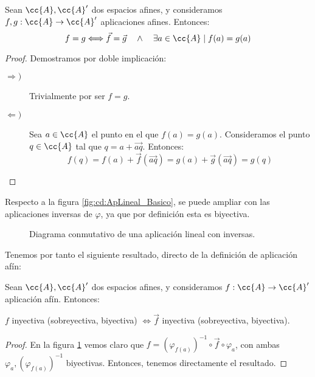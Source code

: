 \begin{teo}\label{teo:UnicidadLinealAsociada}
    Sean $\cc{A},\cc{A}'$ dos espacios afines, y consideramos $f,g:\cc{A}\to \cc{A}'$ aplicaciones afines. Entonces:
    \begin{equation*}
        f=g \Longleftrightarrow
         \vec{f}=\vec{g}
         \quad \land \quad
         \exists a\in \cc{A} \mid f(a)=g(a)
    \end{equation*}
\end{teo}
\begin{proof} Demostramos por doble implicación:
    \begin{description}
        \item[$\Longrightarrow)$] Trivialmente por ser $f=g$.
        \item[$\Longleftarrow)$] Sea $a\in \cc{A}$ el punto en el que $f(a)=g(a)$. Consideramos el punto $q\in \cc{A}$ tal que $q=a+\vec{aq}$. Entonces:
        \begin{equation*}
            f(q) = f(a)+\vec{f}(\vec{aq}) = g(a) + \vec{g}(\vec{aq}) = g(q)
        \end{equation*}
    \end{description}
\end{proof}


Respecto a la figura \ref{fig:cd:ApLineal_Basico}, se puede ampliar con las aplicaciones inversas de $\varphi$, ya que por definición esta es biyectiva. 
\begin{figure}[H]
    \centering
    \caption{Diagrama conmutativo de una aplicación lineal con inversas.}
    \label{fig:cd:ApLineal_Inv}
\end{figure}
Tenemos por tanto el siguiente resultado, directo de la definición de aplicación afín:
\begin{prop}
    Sean $\cc{A},\cc{A}'$ dos espacios afines, y consideramos $f:\cc{A}\to \cc{A}'$ aplicación afín. Entonces:
    \begin{center}
        $f$ inyectiva (sobreyectiva, biyectiva) $\Longleftrightarrow  \vec{f}$ inyectiva (sobreyectiva, biyectiva).
    \end{center}
\end{prop}
\begin{proof}
    En la figura \ref{fig:cd:ApLineal_Inv} vemos claro que $f=(\varphi_{f(a)})^{-1}\circ \vec{f}\circ \varphi_a$, con ambas $\varphi_a, (\varphi_{f(a)})^{-1}$ biyectivas. Entonces, tenemos directamente el resultado.
\end{proof}


